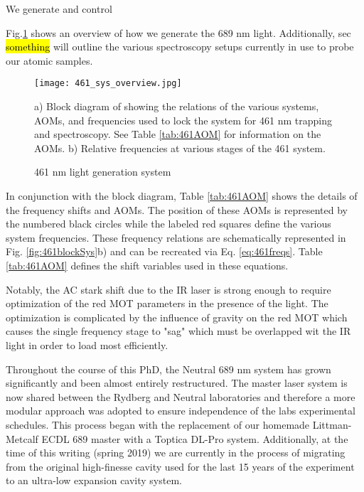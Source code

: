 We generate and control 

Fig.\ref{fig:689blockSys} shows an overview of how we generate the 689 nm light. 
Additionally, sec \hl{something} will outline the various spectroscopy setups currently in use to probe our atomic samples.
	\begin{figure}
		\centerline{
		\texttt{[image: 461\_sys\_overview.jpg]}}
		\caption{461 nm light generation system}{a) Block diagram of showing the relations of the various systems, AOMs, and frequencies used to lock the system for 461 nm trapping and spectroscopy. See Table \ref{tab:461AOM} for information on the AOMs. b) Relative frequencies at various stages of the 461 system.}
		\label{fig:689blockSys}
	\end{figure} 

In conjunction with the block diagram, Table \ref{tab:461AOM} shows the details of the frequency shifts and AOMs. 
The position of these AOMs is represented by the numbered black circles while the labeled red squares define the various system frequencies.
These frequency relations are schematically represented in Fig. \ref{fig:461blockSys}b) and can be recreated via Eq. \ref{eq:461freqs}.
Table \ref{tab:461AOM} defines the shift variables used in these equations.

Notably, the AC stark shift due to the IR laser is strong enough to require optimization of the red MOT parameters in the presence of the light.
The optimization is complicated by the influence of gravity on the red MOT which causes the single frequency stage to "sag" which must be overlapped wit the IR light in order to load most efficiently.
	
Throughout the course of this PhD, the Neutral 689 nm system has grown significantly and been almost entirely restructured. The master laser system is now shared between the Rydberg and Neutral laboratories and therefore a more modular approach was adopted to ensure independence of the labs experimental schedules. This process began with the replacement of our homemade Littman-Metcalf ECDL 689 master with a Toptica DL-Pro system. Additionally, at the time of this writing (spring 2019) we are currently in the process of migrating from the original high-finesse cavity used for the last 15 years \cite{Nagel2004} of the experiment to an ultra-low expansion cavity system. 

